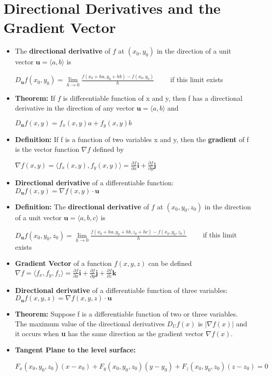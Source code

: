 \documentclass{report}
\begin{document}
	\section{Directional Derivatives and the Gradient Vector}
		\begin{itemize}\addtolength{\leftskip}{2em}
			\item The \textbf{directional derivative} of $f$ at $(x_0,y_0)$ in the direction of a unit vector $\textbf{u}=\langle a,b \rangle$ is
			\begin{center}
			$D_{\textbf{u}}f(x_0,y_0)=\lim\limits_{h\rightarrow 0}\frac{f(x_0+ha,y_0+hb)-f(x_0,y_0)}{h}\quad\quad$ if this limit exists
			\end{center}
			\item \textbf{Theorem: }If $f$ is differentiable function of x and y, then f has a directional derivative in the direction of any vector $\textbf{u}=\langle a,b \rangle$ and
			\begin{center}
			$D_{\textbf{u}}f(x,y)=f_x(x,y)a+f_y(x,y)b$
			\end{center}
			\item \textbf{Definition:} If f is a function of two variables x and y, then the \textbf{gradient} of f is the vector function $\nabla f$ defined by
			\begin{center}
			$\nabla f(x,y)=\langle f_x(x,y),f_y(x,y) \rangle=\frac{\partial f}{\partial x}\textbf{i}+\frac{\partial f}{\partial y}\textbf{j}$
			\end{center}
			\item\textbf{Directional derivative} of a differentiable function:
			\subsubitem $D_{\textbf{u}}f(x,y)=\nabla f(x,y)\cdot \textbf{u}$
			\item \textbf{Definition:} The \textbf{directional derivative} of $f$ at $(x_0,y_0,z_0)$ in the direction of a unit vector $\textbf{u}=\langle a,b,c \rangle $ is
			\begin{center}
			$D_{\textbf{u}}f(x_0,y_0,z_0)=\lim\limits_{h\rightarrow 0}\frac{f(x_0+ha,y_0+hb,z_0+hc)-f(x_0,y_0,z_0)}{h}\quad\quad$ if this limit exists
			\end{center}
			\item \textbf{Gradient Vector} of a function $f(x,y,z)$ can be defined
			\Large\subsubitem $\nabla f=\langle f_x,f_y,f_z \rangle = \frac{\partial f}{\partial x}\textbf{i}+\frac{\partial f}{\partial y}\textbf{j}+\frac{\partial f}{\partial z}\textbf{k}$
			\large\item\textbf{Directional derivative} of a differentiable function of three variables:
			\subsubitem $D_{\textbf{u}}f(x,y,z)=\nabla f(x,y,z)\cdot \textbf{u}$
			\item \textbf{Theorem:} Suppose f is a differentiable function of two or three variables. The maximum value of the directional derivatives $D_Uf(x)$ is $|\nabla f(x)|$ and it occurs when \textbf{u} has the same direction as the gradient vector $\nabla f(x)$.
			\item \textbf{Tangent Plane to the level surface:} 
			\begin{center}
			$F_x(x_0,y_0,z_0)(x-x_0)+F_y(x_0,y_0,z_0)(y-y_0)+F_z(x_0,y_0,z_0)(z-z_0)=0$
			\end{center}
		\end{itemize}
\end{document}
